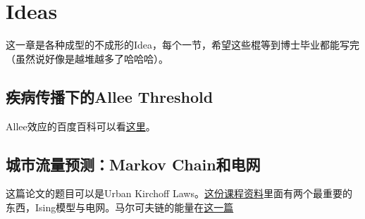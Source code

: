 \chapter{Ideas} 

这一章是各种成型的不成形的Idea，每个一节，希望这些棍等到博士毕业都能写完（虽然说好像是越堆越多了哈哈哈）。

\section{疾病传播下的Allee Threshold}

Allee效应的百度百科可以看\href{https://baike.baidu.com/item/阿利效应/3703518?fr=aladdin}{这里}。

\section{城市流量预测：Markov Chain和电网}

这篇论文的题目可以是Urban Kirchoff Laws。\href{http://galton.uchicago.edu/~lalley/Courses/313/index.html}{这份课程资料}里面有两个最重要的东西，Ising模型与电网。马尔可夫链的能量在\href{https://math.dartmouth.edu/~doyle/docs/energy/energy.pdf}{这一篇}